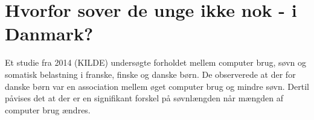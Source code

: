 \section{Hvorfor sover de unge ikke nok - i Danmark?}
\label{sec:hvorforSoverDeUngeIkkeNok}

Et studie fra 2014 (KILDE) undersøgte forholdet mellem computer brug, søvn og somatisk belastning i franske, finske og danske børn. De observerede at der for danske børn var en association mellem øget computer brug og mindre søvn. Dertil påvises det at der er en signifikant forskel på søvnlængden når mængden af computer brug ændres.


 




